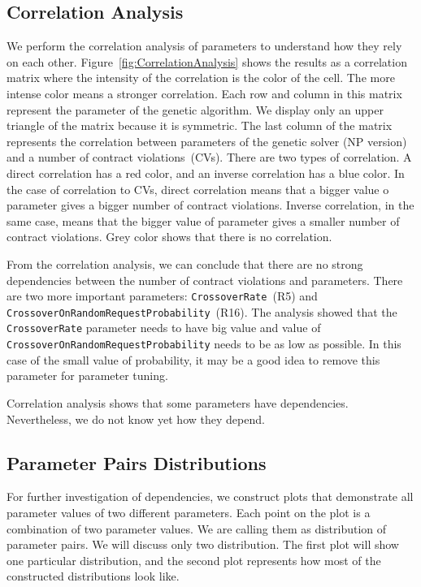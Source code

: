 \subsection{Correlation Analysis}

We perform the correlation analysis of parameters to understand how they rely on each other. Figure~\ref{fig:CorrelationAnalysis} shows the results as a correlation matrix where the intensity of the correlation is the color of the cell. The more intense color means a stronger correlation. Each row and column in this matrix represent the parameter of the genetic algorithm. We display only an upper triangle of the matrix because it is symmetric. The last column of the matrix represents the correlation between parameters of the genetic solver (NP version) and a number of contract violations~(CVs). There are two types of correlation. A direct correlation has a red color, and an inverse correlation has a blue color. In the case of correlation to CVs, direct correlation means that a bigger value o parameter gives a bigger number of contract violations. Inverse correlation, in the same case, means that the bigger value of parameter gives a smaller number of contract violations. Grey color shows that there is no correlation.

From the correlation analysis, we can conclude that there are no strong dependencies between the number of contract violations and parameters. There are two more important parameters: \texttt{CrossoverRate}~(R5) and \texttt{Cross\-ov\-er\-On\-Ran\-dom\-Re\-qu\-est\-Pro\-ba\-bi\-li\-ty}~(R16).
The analysis showed that the \texttt{CrossoverRate} parameter needs to have big value and value of \texttt{Cross\-ov\-er\-On\-Ran\-dom\-Re\-qu\-est\-Pro\-ba\-bi\-li\-ty} needs to be as low as possible. In this case of the small value of probability, it may be a good idea to remove this parameter for parameter tuning.

Correlation analysis shows that some parameters have dependencies. Nevertheless, we do not know yet how they depend.

\subsection{Parameter Pairs Distributions}

For further investigation of dependencies, we construct plots that demonstrate all parameter values of two different parameters.
Each point on the plot is a combination of two parameter values. We are calling them as distribution of parameter pairs. We will discuss only two distribution. The first plot will show one particular distribution, and the second plot represents how most of the constructed distributions look like.

